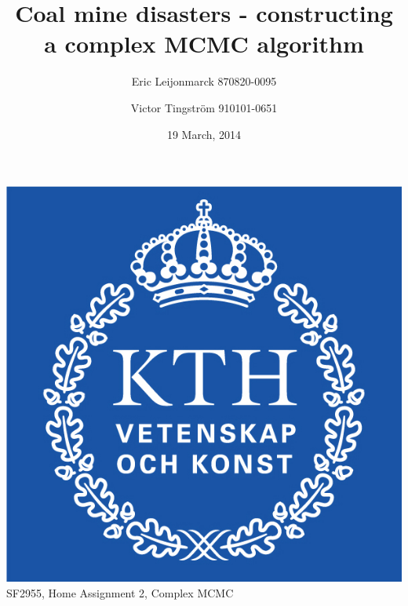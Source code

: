 \documentclass[11pt]{article}
\title{Coal mine disasters - constructing a complex MCMC algorithm}
\author{Eric Leijonmarck 870820-0095 \and Victor Tingstr\"{o}m 910101-0651}
\date{19 March, 2014}
\begin{document}
\begin{titlepage}

\begin{center}

\includegraphics[scale=2]{kth}
\\[\baselineskip]
{\LARGE 
SF2955, Home Assignment 2, Complex MCMC}

\end{center}


\end{titlepage}
\end{document}
